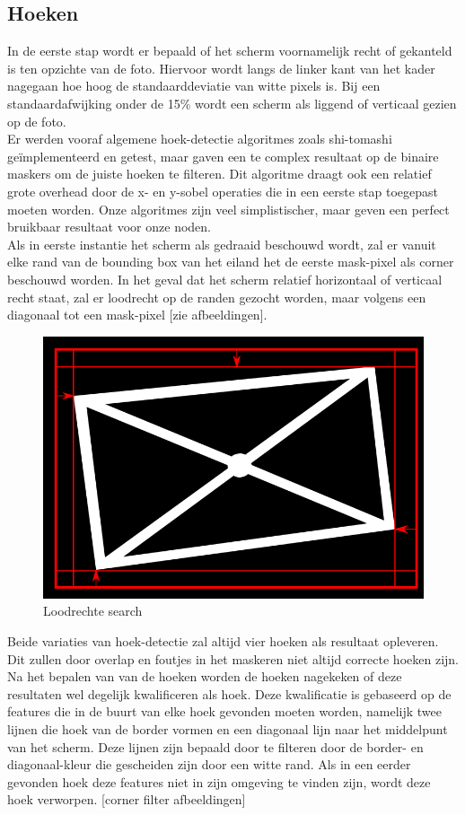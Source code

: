 \subsection{Hoeken}
In de eerste stap wordt er bepaald of het scherm voornamelijk recht of gekanteld is ten opzichte van de foto. Hiervoor wordt langs de linker kant van het kader nagegaan hoe hoog de standaarddeviatie van witte pixels is. Bij een standaardafwijking onder de 15\% wordt een scherm als liggend of verticaal gezien op de foto.\\
Er werden vooraf algemene hoek-detectie algoritmes zoals shi-tomashi geïmplementeerd en getest, maar gaven een te complex resultaat op de binaire maskers om de juiste hoeken te filteren. Dit algoritme draagt ook een relatief grote overhead door de x- en y-sobel operaties die in een eerste stap toegepast moeten worden. Onze algoritmes zijn veel simplistischer, maar geven een perfect bruikbaar resultaat voor onze noden.\\
Als in eerste instantie het scherm als gedraaid beschouwd wordt, zal er vanuit elke rand van de bounding box van het eiland het de eerste mask-pixel als corner beschouwd worden. In het geval dat het scherm relatief horizontaal of verticaal recht staat, zal er loodrecht op de randen gezocht worden, maar volgens een diagonaal tot een mask-pixel [zie afbeeldingen].\\

\begin{figure}[h]
\centering
\includegraphics[scale=0.6]{img/perpSearch.png}
\caption{Loodrechte search}
\end{figure}

Beide variaties van hoek-detectie zal altijd vier hoeken als resultaat opleveren. Dit zullen door overlap en foutjes in het maskeren niet altijd correcte hoeken zijn. Na het bepalen van van de hoeken worden de hoeken nagekeken of deze resultaten wel degelijk kwalificeren als hoek. Deze kwalificatie is gebaseerd op de features die in de buurt van elke hoek gevonden moeten worden, namelijk twee lijnen die hoek van de border vormen en een diagonaal lijn naar het middelpunt van het scherm. Deze lijnen zijn bepaald door te filteren door de border- en diagonaal-kleur die gescheiden zijn door een witte rand. Als in  een eerder gevonden hoek deze features niet in zijn omgeving te vinden zijn, wordt deze hoek verworpen. 
[corner filter afbeeldingen]\\

